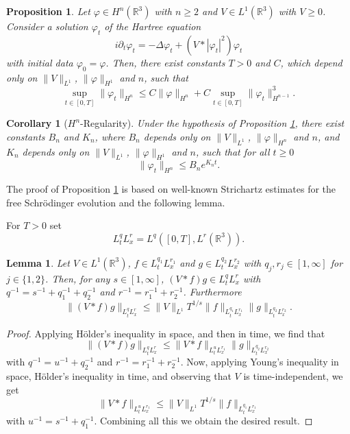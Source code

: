 \documentclass[11pt,a4paper,draft,DIV11]{scrartcl}	%
\newtheorem{cor}[thm]{Corollary}
\newtheorem{prp}[thm]{Proposition}
\newtheorem{lem}[thm]{Lemma}
\newcommand{\R}{\mathds{R}}
\begin{document}
\begin{prp} \label{p:lregn}
  Let $\varphi \in H^n(\R^3)$ with $n \geq 2$ and $V \in L^1(\R^3)$ with $V \ge 0$. Consider a
  solution $\varphi_t$ of the Hartree equation
  \[
    i \partial_t \varphi_t = - \Delta \varphi_t + (V * |\varphi_t|^2)
    \varphi_t
  \]
  with initial data $\varphi_0 = \varphi$. Then, there exist constants $T > 0$
  and $C$, which depend only on $\| V \|_{L^1}$, $\| \varphi \|_{H^1}$ and
  $n$, such that
  \[
    \sup_{t \in [0,T]} \| \varphi_t \|_{H^n} \le C \| \varphi \|_{H^n} + C
    \sup_{t \in [0,T]} \| \varphi_t \|_{H^{n-1}}^3.
  \]
\end{prp}


\begin{cor}[$H^n$-Regularity] \label{c:regn}
  Under the hypothesis of Proposition \ref{p:lregn}, there exist constants
  $B_n$ and $K_n$, where $B_n$ depends only on $\| V \|_{L^1}$, $\| \varphi
  \|_{H^n}$ and $n$, and $K_n$ depends only on $\| V \|_{L^1}$, $\| \varphi
  \|_{H^1}$ and $n$, such that for all $t \ge 0$
  \[
    \| \varphi_t \|_{H^n} \le B_n e^{K_n t}.
  \]
\end{cor}

The proof of Proposition \ref{p:lregn} is based on well-known Strichartz
estimates for the free Schr\"odinger evolution and the following lemma.


For $T > 0$ set
\[
  L_t^q L_x^r = L^q([0,T], L^r(\R^3)).
\]


\begin{lem} \label{l:interp}
  Let $V \in L^1(\R^3)$, $f \in L_t^{q_1} L_x^{r_1}$ and $g \in L_t^{q_2}
  L_x^{r_2}$ with $q_j, r_j \in [1,\infty]$ for $j \in \{1,2\}$. Then, for any $s \in [1, \infty]$, $(V * f)
  g \in L_t^q L_x^r$ with $q^{-1} = s^{-1} + q_1^{-1} + q_2^{-1}$ and $r^{-1}
  = r_1^{-1} + r_2^{-1}$. Furthermore
  \[
    \| (V * f)g \|_{L_t^q L_x^r} \le \| V \|_{L^1} T^{1/s} \| f \|_{L_t^{q_1}
    L_x^{r_1}} \| g \|_{L_t^{q_2} L_x^{r_2}}.
  \]
\end{lem}


\begin{proof}
  Applying H\"older's inequality in space, and then in time, we find that
  \[
    \| (V * f) g \|_{L_t^q L_x^r} \le \| V * f \|_{L_t^u L_x^{r_1}} \| g
    \|_{L_t^{q_2} L_x^{r_2}}
  \]
  with $q^{-1} = u^{-1} + q_2^{-1}$ and $r^{-1} = r_1^{-1} + r_2^{-1}$. Now,
  applying Young's inequality in space, H\"older's inequality in time, and
  observing that $V$ is time-independent, we get
  \[
    \| V * f \|_{L_t^u L_x^{r_1}} \le \| V \|_{L^1} T^{1/s} \| f \|_{L_t^{q_1}
    L_x^{r_1}}
  \]
  with $u^{-1} = s^{-1} + q_1^{-1}$. Combining all this we obtain the desired
  result.
\end{proof}
\end{document}
